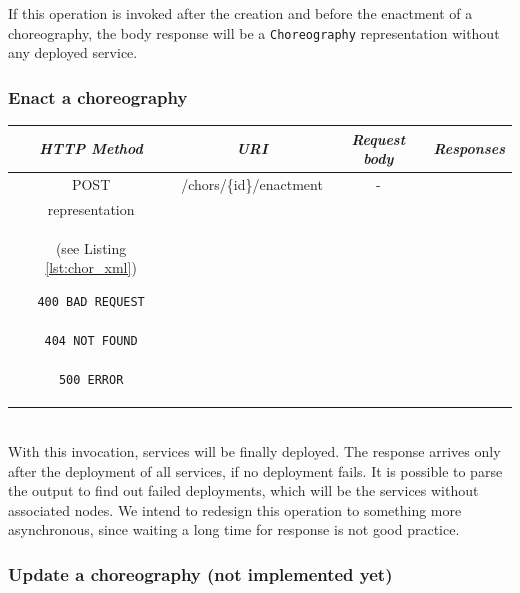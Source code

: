 \documentclass[a4paper, 10pt]{article}
\begin{document}
If this operation is invoked after the creation and before the enactment of a choreography, the body response will be a \verb!Choreography! representation without any deployed service.

\subsubsection*{Enact a choreography}

\begin{tabular}{|c|c|c|c|}
\hline 
\itshape{HTTP Method} & \itshape{URI} & \itshape{Request body} & \itshape{Responses} \\ 
\hline 
POST & /chors/\{id\}/enactment & - &
\begin{minipage}{2in}
\begin{verbatim}

200 OK
location = "/chors/{id}"
Body: 
\end{verbatim}
\verb!Choreography! XML \\
representation \\
(see Listing \ref{lst:chor_xml})
\begin{verbatim}
400 BAD REQUEST

404 NOT FOUND

500 ERROR

\end{verbatim}
\end{minipage} 
\\ 
\hline 
\end{tabular} \\

With this invocation, services will be finally deployed.
The response arrives only after the deployment of all services, if no deployment fails.
It is possible to parse the output to find out failed deployments, which will be the services without associated nodes.
We intend to redesign this operation to something more asynchronous, since waiting a long time for response is not good practice.

\subsubsection*{Update a choreography (not implemented yet)}
\end{document}
